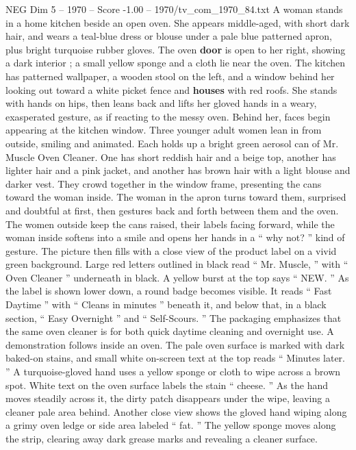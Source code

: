 \begin{textsample}{NEG Dim 5 – 1970 – Score -1.00 – 1970/tv\_com\_1970\_84.txt}  \label{ex:f5_neg_009}
A woman stands in a home kitchen beside an open oven.
She appears middle-aged, with short dark hair, and wears a teal-blue dress or blouse under a pale blue patterned apron, plus bright turquoise rubber gloves.
The oven \textbf{door} is open to her right, showing a dark interior ; a small yellow sponge and a cloth lie near the oven.
The kitchen has patterned wallpaper, a wooden stool on the left, and a window behind her looking out toward a white picket fence and \textbf{houses} with red roofs.
She stands with hands on hips, then leans back and lifts her gloved hands in a weary, exasperated gesture, as if reacting to the messy oven.
Behind her, faces begin appearing at the kitchen window.
Three younger adult women lean in from outside, smiling and animated.
Each holds up a bright green aerosol can of Mr.
Muscle Oven Cleaner.
One has short reddish hair and a beige top, another has lighter hair and a pink jacket, and another has brown hair with a light blouse and darker vest.
They crowd together in the window frame, presenting the cans toward the woman inside.
The woman in the apron turns toward them, surprised and doubtful at first, then gestures back and forth between them and the oven.
The women outside keep the cans raised, their labels facing forward, while the woman inside softens into a smile and opens her hands in a “ why not? ” kind of gesture.
The picture then fills with a close view of the product label on a vivid green background.
Large red letters outlined in black read “ Mr.
Muscle, ” with “ Oven Cleaner ” underneath in black.
A yellow burst at the top says “ NEW. ” As the label is shown lower down, a round badge becomes visible.
It reads “ Fast Daytime ” with “ Cleans in minutes ” beneath it, and below that, in a black section, “ Easy Overnight ” and “ Self-Scours. ” The packaging emphasizes that the same oven cleaner is for both quick daytime cleaning and overnight use.
A demonstration follows inside an oven.
The pale oven surface is marked with dark baked-on stains, and small white on-screen text at the top reads “ Minutes later. ” A turquoise-gloved hand uses a yellow sponge or cloth to wipe across a brown spot.
White text on the oven surface labels the stain “ cheese. ” As the hand moves steadily across it, the dirty patch disappears under the wipe, leaving a cleaner pale area behind.
Another close view shows the gloved hand wiping along a grimy oven ledge or side area labeled “ fat. ” The yellow sponge moves along the strip, clearing away dark grease marks and revealing a cleaner surface.

\end{textsample}

